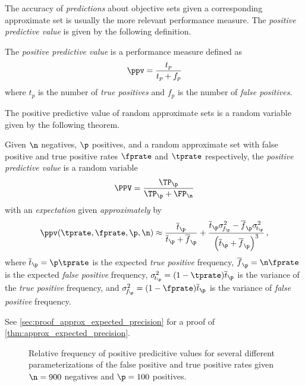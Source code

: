 \documentclass[ ../main.tex]{subfiles}
\begin{document}
The accuracy of \emph{predictions} about objective sets given a corresponding approximate set is usually the more relevant performance measure.
The \emph{positive predictive value} is given by the following definition.
\begin{definition}
	The \emph{positive predictive value} is a performance measure defined as
	\begin{equation}
	\ppv = \frac{t_p}{t_p + f_p}
	\end{equation}
	where $t_p$ is the number of \emph{true positives} and $f_p$ is the number of \emph{false positives}.
\end{definition}

The positive predictive value of random approximate sets is a random variable given by the following theorem.
\begin{theorem}
	\label{thm:approx_expected_precision}
	Given $\n$ negatives, $\p$ positives, and a random approximate set with false positive and true positive rates $\fprate$ and $\tprate$ respectively, the \emph{positive predictive value} is a random variable
	\begin{equation}
	\PPV = \frac{\TP_{\p}}{\TP_{\p} + \FP_{\n}}
	\end{equation}
	with an \emph{expectation} given \emph{approximately} by
	\begin{equation}
	\label{eq:approx_expected_precision}
	\ppv(\tprate, \fprate, \p, \n) \approx 
	\frac{\overline{t}_\p}{\overline{t}_\p + \overline{f}_\p} +
	\frac{\overline{t}_\p \sigma_{\!f_\p}^2 - \overline{f}_\p 
		\sigma_{\!t_\p}^2}{\left(\overline{t}_\p + \overline{f}_\p\right)^3}\,,
	\end{equation}
	where $\overline{t}_\p = \p \tprate$ is the expected \emph{true positive} frequency, $\overline{f}_\p =  \n \fprate$ is the expected \emph{false positive} frequency, $\sigma_{\!t_\p}^2 = (1-\tprate) \overline{t}_\p$ is the variance of the \emph{true positive} frequency, and $\sigma_{\!f_\p}^2 = (1-\fprate) \overline{t}_\p$ is the variance of \emph{false positive} frequency.
\end{theorem}
See \cref{sec:proof_approx_expected_precision} for a proof of 
\cref{thm:approx_expected_precision}.

\begin{figure}
	\def\svgwidth{\columnwidth/2}
	\centering
	\captionsetup{justification=centering}
	\caption
	{
		Relative frequency of positive predicitive values for several different parameterizations of the false positive and true positive rates given $\n = 900$ negatives and $\p=100$ positives.
	}    
	
	\label{fig:prec_vs_fprate_and_fnrate}
\end{figure}
\end{document}
